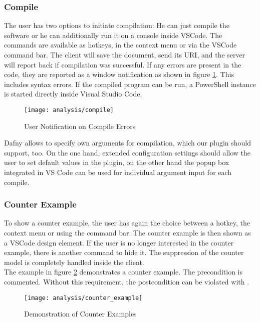 \subsubsection{Compile}
The user has two options to initiate compilation: He can just compile the software or he can additionally run it on a console inside VSCode.
The commands are available as hotkeys, in the context menu or via the VSCode command bar.
The client will save the document, send its URI, and the server will report back if compilation was successful.
If any errors are present in the code, they are reported as a window notification as shown in figure \ref{fig:analysis_compile}.
This includes syntax errors. If the compiled program can be run, a PowerShell instance is started directly inside Visual Studio Code.

\begin{figure}[H]
    \centering
    \texttt{[image: analysis/compile]}
    \caption{User Notification on Compile Errors}
    \label{fig:analysis_compile}
\end{figure}

Dafny allows to specify own arguments for compilation, which our plugin should support, too.
On the one hand, extended configuration settings should allow the user to set default values in the plugin, on the other hand the popup box integrated in VS Code can be used for individual argument input for each compile.

\subsubsection{Counter Example}
To show a counter example, the user has again the choice between a hotkey, the context menu or using the command bar.
The counter example is then shown as a VSCode design element.
If the user is no longer interested in the counter example, there is another command to hide it.
The suppression of the counter model is completely handled inside the client. \\

The example in figure \ref{fig:analysis_counter_example} demonstrates a counter example.
The precondition is commented. Without this requirement, the postcondition can be violated with .

\begin{figure}[H]
    \centering
    \texttt{[image: analysis/counter\_example]}
    \caption{Demonstration of Counter Examples}
    \label{fig:analysis_counter_example}
\end{figure}


